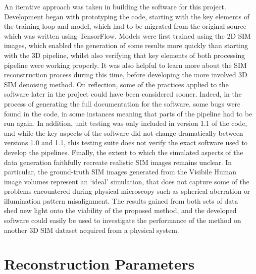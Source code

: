 \documentclass[12pt]{article}
\begin{document}
An iterative approach was taken in building the software for this project.
Development began with prototyping the code, starting with the key elements of the training loop and model,
which had to be migrated from the original source which was written using TensorFlow.
Models were first trained using the 2D SIM images,
which enabled the generation of some results more quickly than starting with the 3D pipeline,
whilst also verifying that key elements of both processing pipeline were working properly.
It was also helpful to learn more about the SIM reconstruction process during this time,
before developing the more involved 3D SIM denoising method.
On reflection, some of the practices applied to the software later in the project could have been considered sooner.
Indeed, in the process of generating the full documentation for the software,
some bugs were found in the code, in some instances meaning that parts of the pipeline had to be run again.
In addition, unit testing was only included in version 1.1 of the code,
and while the key aspects of the software did not change dramatically between versions 1.0 and 1.1,
this testing suite does not verify the exact software used to develop the pipelines.
Finally, the extent to which the simulated aspects of the data generation faithfully recreate realistic SIM images remains unclear.
In particular, the ground-truth SIM images generated from the Visibile Human image volumes represent an `ideal' simulation,
that does not capture some of the problems encountered during physical microscopy such as spherical aberration or illumination pattern misalignment.
The results gained from both sets of data shed new light onto the viability of the proposed method,
and the developed software could easily be used to investigate the performance of the method on another 3D SIM dataset acquired from a physical system.

\newpage




\newpage

\appendix

\section{Reconstruction Parameters}
\end{document}

